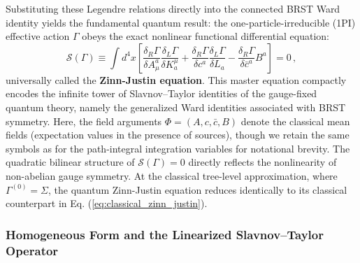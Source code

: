 Substituting these Legendre relations directly into the connected BRST Ward identity yields the fundamental quantum result: the one-particle-irreducible (1PI) effective action \(\Gamma\) obeys the exact nonlinear functional differential equation:
\begin{equation} \label{eq:quantum_zinn_justin}
    \boxed{\mathcal{S}(\Gamma) \equiv \int d^4x \left[ \frac{\delta_R \Gamma}{\delta A_\mu^a} \frac{\delta_L \Gamma}{\delta K_a^\mu} + \frac{\delta_R \Gamma}{\delta c^a} \frac{\delta_L \Gamma}{\delta L_a} - \frac{\delta_R \Gamma}{\delta \bar{c}^a} B^a \right] = 0} \, ,
\end{equation}
universally called the \textbf{Zinn-Justin equation}. This master equation compactly encodes the infinite tower of Slavnov--Taylor identities of the gauge-fixed quantum theory, namely the generalized Ward identities associated with BRST symmetry. Here, the field arguments \(\Phi = (A, c, \bar{c}, B)\) denote the classical mean fields (expectation values in the presence of sources), though we retain the same symbols as for the path-integral integration variables for notational brevity. The quadratic bilinear structure of \(\mathcal{S}(\Gamma) = 0\) directly reflects the nonlinearity of non-abelian gauge symmetry. At the classical tree-level approximation, where \(\Gamma^{(0)} = \Sigma\), the quantum Zinn-Justin equation reduces identically to its classical counterpart in Eq. (\ref{eq:classical_zinn_justin}).

\subsubsection{Homogeneous Form and the Linearized Slavnov--Taylor Operator}

